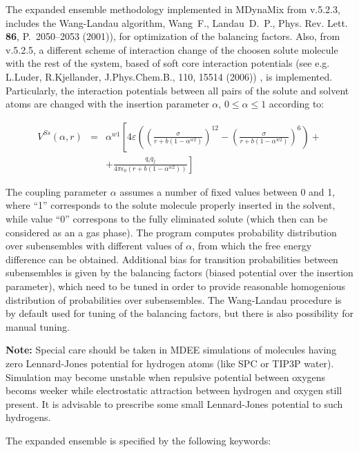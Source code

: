 \documentclass{article}
\begin{document}
The expanded ensemble methodology implemented in MDynaMix from v.5.2.3,
includes the Wang-Landau algorithm,
Wang~F., Landau~D.~P., Phys. Rev. Lett. {\bf 86}, P.~2050--2053 (2001)),
for optimization of the balancing factors. Also, from v.5.2.5,  
a different scheme of interaction change of the choosen solute molecule 
with the rest of the system, based of soft core interaction potentials
(see e.g. L.Luder, R.Kjellander, J.Phys.Chem.B., 110, 15514 (2006)) ,
is implemented. Particularly, the interaction potentials 
between all pairs of the solute and solvent atoms are changed with the insertion
parameter $\alpha$,  $0 \le \alpha \le 1$ according to:

\begin{eqnarray}
\label{softp}
\nonumber
V^{Ss}(\alpha,r) &=& \alpha^{w1} \left[ 4 \varepsilon 
\left( \left(\frac{\sigma}{r+b(1-\alpha^{w2})}\right)^{12}-
\left(\frac{\sigma}{r+b(1-\alpha^{w2})}\right)^6\right) + \right.\\
&&+ \left. \frac{q_i q_j}{4 \pi \epsilon_0 (r+b(1-\alpha^{w2}))} \right]
\end{eqnarray}

The coupling parameter $\alpha$ assumes a number of fixed values between 
0 and 1, where ``1'' corresponds to the solute molecule properly inserted 
in the solvent, while value ``0'' correspons to the fully eliminated 
solute (which then can be considered as an a gas phase). The program computes 
probability distribution over subensembles with different values of $\alpha$, 
from which the free energy difference can be obtained. Additional bias for 
transition probabilities between subensembles is given by the  
balancing factors (biased potential over the insertion parameter), which need 
to be tuned in order to provide reasonable
homogenious distribution of probabilities over subensembles. The Wang-Landau
procedure is by default used for tuning of the balancing factors, but there
is also possibility for manual tuning.

{\bf Note:}  Special care should be taken in  MDEE simulations of molecules 
having zero Lennard-Jones potential for hydrogen atoms (like SPC or TIP3P 
water). Simulation may become unstable when repulsive potential between 
oxygens becoms weeker while electrostatic attraction between hydrogen and 
oxygen still present. It is advisable to prescribe some small Lennard-Jones 
potential to such hydrogens.

The expanded ensemble is specified by the following keywords:
\end{document}
